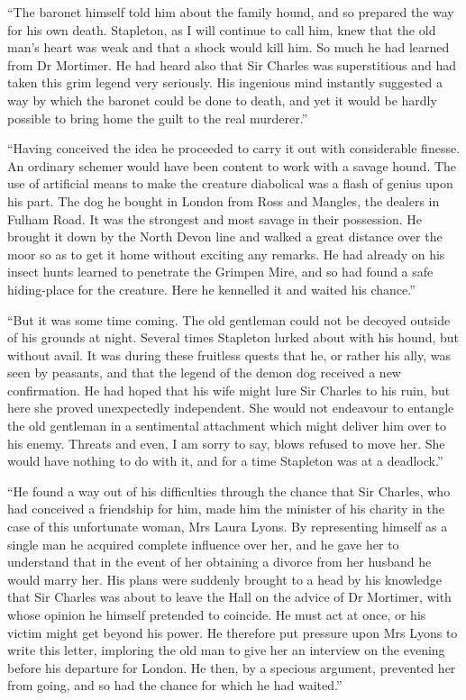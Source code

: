 \documentclass[paper=5.5in:8.5in,BCOR=7mm,twoside,DIV=calc,12pt,usegeometry,openany,chapterprefix,endperiod,headings=big]{scrbook} %
\begin{document}
\enquote{The baronet himself told him about the family hound, and so prepared the way for his own death. Stapleton, as I will continue to call him, knew that the old man's heart was weak and that a shock would kill him. So much he had learned from Dr Mortimer. He had heard also that Sir Charles was superstitious and had taken this grim legend very seriously. His ingenious mind instantly suggested a way by which the baronet could be done to death, and yet it would be hardly possible to bring home the guilt to the real murderer.}

\enquote{Having conceived the idea he proceeded to carry it out with considerable finesse. An ordinary schemer would have been content to work with a savage hound. The use of artificial means to make the creature diabolical was a flash of genius upon his part. The dog he bought in London from Ross and Mangles, the dealers in Fulham Road. It was the strongest and most savage in their possession. He brought it down by the North Devon line and walked a great distance over the moor so as to get it home without exciting any remarks. He had already on his insect hunts learned to penetrate the Grimpen Mire, and so had found a safe hiding-place for the creature. Here he kennelled it and waited his chance.}

\enquote{But it was some time coming. The old gentleman could not be decoyed outside of his grounds at night. Several times Stapleton lurked about with his hound, but without avail. It was during these fruitless quests that he, or rather his ally, was seen by peasants, and that the legend of the demon dog received a new confirmation. He had hoped that his wife might lure Sir Charles to his ruin, but here she proved unexpectedly independent. She would not endeavour to entangle the old gentleman in a sentimental attachment which might deliver him over to his enemy. Threats and even, I am sorry to say, blows refused to move her. She would have nothing to do with it, and for a time Stapleton was at a deadlock.}

\enquote{He found a way out of his difficulties through the chance that Sir Charles, who had conceived a friendship for him, made him the minister of his charity in the case of this unfortunate woman, Mrs Laura Lyons. By representing himself as a single man he acquired complete influence over her, and he gave her to understand that in the event of her obtaining a divorce from her husband he would marry her. His plans were suddenly brought to a head by his knowledge that Sir Charles was about to leave the Hall on the advice of Dr Mortimer, with whose opinion he himself pretended to coincide. He must act at once, or his victim might get beyond his power. He therefore put pressure upon Mrs Lyons to write this letter, imploring the old man to give her an interview on the evening before his departure for London. He then, by a specious argument, prevented her from going, and so had the chance for which he had waited.}
\end{document}
